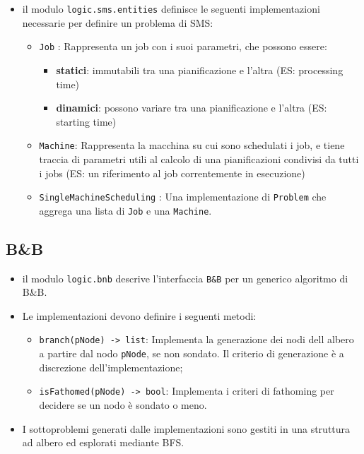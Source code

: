 \documentclass[compress]{beamer}
\begin{document}
    \begin{frame}{\subsecname}
        \begin{itemize}
            \item il modulo \texttt{logic.sms.entities} definisce le seguenti implementazioni
            necessarie per definire un problema di SMS:
            \begin{itemize}
                \item \texttt{Job} : Rappresenta un job con i suoi parametri, che possono essere:
                \begin{itemize}
                    \item \textbf{statici}: immutabili tra una pianificazione e l'altra (ES: processing time)
                    \item \textbf{dinamici}: possono variare tra una pianificazione e l'altra (ES: starting time)
                \end{itemize}
                \item \texttt{Machine}: Rappresenta la macchina su cui sono schedulati i job, e
                tiene traccia di parametri utili al calcolo di una pianificazioni condivisi da
                tutti i jobs (ES: un riferimento al job correntemente in esecuzione)
                \item \texttt{SingleMachineScheduling} : Una implementazione di \texttt{Problem} che
                aggrega una lista di \texttt{Job} e una \texttt{Machine}.
            \end{itemize}
        \end{itemize}
    \end{frame}

    
    \subsection{B\&B}

    \begin{frame}[fragile]{\subsecname}
        \begin{itemize}
            \item il modulo \texttt{logic.bnb} descrive l'interfaccia \texttt{B\&B} per un generico algoritmo
            di B\&B.
            \item Le implementazioni devono definire i seguenti metodi:
            \begin{itemize}
                \item \texttt{branch(pNode) -> list}: Implementa la generazione dei
                nodi dell albero a partire dal nodo \texttt{pNode}, se non sondato.
                Il criterio di generazione è a discrezione dell'implementazione;
                \item \texttt{isFathomed(pNode) -> bool}: Implementa i criteri di fathoming
                per decidere se un nodo è sondato o meno.
            \end{itemize}
            \item I sottoproblemi generati dalle implementazioni sono gestiti in una 
            struttura ad albero ed esplorati mediante BFS.
        \end{itemize}
    \end{frame}
\end{document}
